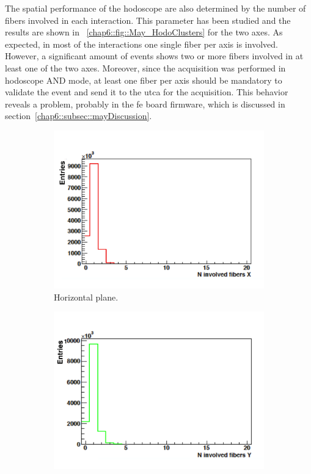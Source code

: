 The spatial performance of the hodoscope are also determined by the number of fibers involved in each interaction. This parameter has been studied and the results are shown in \figurename~\ref{chap6::fig::May_HodoClusters} for the two axes. As expected, in most of the interactions one single fiber per axis is involved. However, a significant amount of events shows two or more fibers involved in at least one of the two axes. Moreover, since the acquisition was performed in hodoscope AND mode, at least one fiber per axis should be mandatory to validate the event and send it to the \gls{utca} for the acquisition. This behavior reveals a problem, probably in the \gls{fe} board firmware, which is discussed in section~\ref{chap6::subsec::mayDiscussion}. 
 
\begin{figure}
\begin{subfigure}[t]{.5\textwidth}
\centering
\includegraphics[width=1.\textwidth]{03_GraphicFiles/chapter6_BeamTests/Nice_May2018/clusterX.png}
\caption{Horizontal plane.}
\label{chap6::fig::May_HodoClusX}
\end{subfigure}
\begin{subfigure}[t]{.5\textwidth}
\centering
\includegraphics[width=1.\textwidth]{03_GraphicFiles/chapter6_BeamTests/Nice_May2018/clusterY.png}	

\end{subfigure}
\end{figure}
